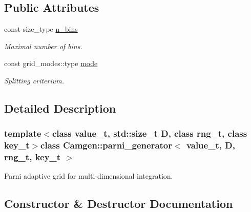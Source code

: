 \subsection*{Public Attributes}
\begin{DoxyCompactItemize}
\item 
\hypertarget{a00393_a86c174679f23b32ed406f0d9d8220218}{}const size\+\_\+type \hyperlink{a00393_a86c174679f23b32ed406f0d9d8220218}{n\+\_\+bins}\label{a00393_a86c174679f23b32ed406f0d9d8220218}

\begin{DoxyCompactList}\small\item\em Maximal number of bins. \end{DoxyCompactList}\item 
\hypertarget{a00393_af28a46b346df866b404d50f094dc0da5}{}const grid\+\_\+modes\+::type \hyperlink{a00393_af28a46b346df866b404d50f094dc0da5}{mode}\label{a00393_af28a46b346df866b404d50f094dc0da5}

\begin{DoxyCompactList}\small\item\em Splitting criterium. \end{DoxyCompactList}\end{DoxyCompactItemize}


\subsection{Detailed Description}
\subsubsection*{template$<$class value\+\_\+t, std\+::size\+\_\+t D, class rng\+\_\+t, class key\+\_\+t$>$class Camgen\+::parni\+\_\+generator$<$ value\+\_\+t, D, rng\+\_\+t, key\+\_\+t $>$}

Parni adaptive grid for multi-\/dimensional integration. 

\subsection{Constructor \& Destructor Documentation}
\hypertarget{a00393_a1bed51e5d9a2f72de634a028e870ce20}{}
